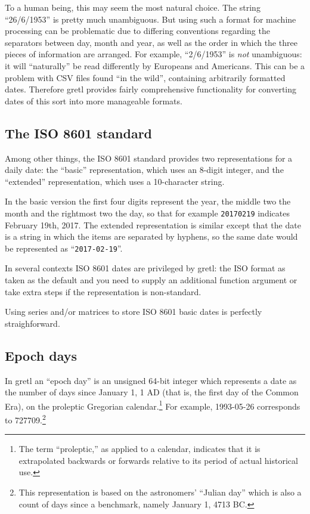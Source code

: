 To a human being, this may seem the most natural choice.  The string
``26/6/1953'' is pretty much unambiguous. But using such a format for
machine processing can be problematic due to differing conventions
regarding the separators between day, month and year, as well as the
order in which the three pieces of information are arranged.  For
example, ``2/6/1953'' is \textit{not} unambiguous: it will
``naturally'' be read differently by Europeans and Americans. This can
be a problem with CSV files found ``in the wild'', containing
arbitrarily formatted dates. Therefore gretl provides fairly
comprehensive functionality for converting dates of this sort into
more manageable formats.

\subsection{The ISO 8601 standard}
\label{sec:cal-ISO8601}

Among other things, the ISO 8601 standard provides two representations
for a daily date: the ``basic'' representation, which uses an 8-digit
integer, and the ``extended'' representation, which uses a
10-character string.

In the basic version the first four digits represent the year, the
middle two the month and the rightmost two the day, so that for
example \texttt{20170219} indicates February 19th, 2017. The extended
representation is similar except that the date is a string in which
the items are separated by hyphens, so the same date would be
represented as ``\texttt{2017-02-19}''.

In several contexts ISO 8601 dates are privileged by gretl: the ISO
format as taken as the default and you need to supply an additional
function argument or take extra steps if the representation is
non-standard.

Using series and/or matrices to store ISO 8601 basic dates is
perfectly straighforward.

\subsection{Epoch days}
\label{sec:cal-epochday}

In gretl an ``epoch day'' is an unsigned 64-bit integer which
represents a date as the number of days since January 1, 1 AD (that
is, the first day of the Common Era), on the proleptic Gregorian
calendar.\footnote{The term ``proleptic,'' as applied to a calendar,
  indicates that it is extrapolated backwards or forwards relative to
  its period of actual historical use.} For example, 1993-05-26
corresponds to 727709.\footnote{This representation is based on the
  astronomers' ``Julian day'' which is also a count of days since a
  benchmark, namely January 1, 4713 BC.}


